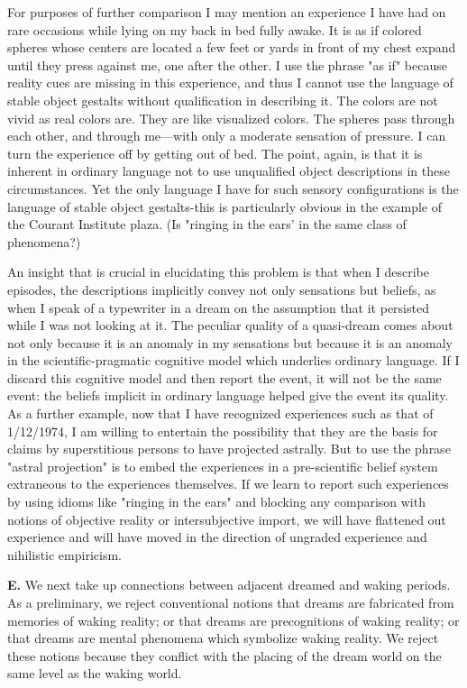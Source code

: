 \documentclass[10pt,twoside,draft]{memoir}
\begin{document}
{{For purposes of further comparison I may mention an experience I 
have had on rare occasions while lying on my back in bed fully awake. It is 
as if colored spheres whose centers are located a few feet or yards in front of 
my chest expand until they press against me, one after the other. I use the 
phrase "as if" because reality cues are missing in this experience, and thus I 
cannot use the language of stable object gestalts without qualification in 
describing it. The colors are not vivid as real colors are. They are like 
visualized colors. The spheres pass through each other, and through me---with 
only a moderate sensation of pressure. I can turn the experience off by 
getting out of bed. The point, again, is that it is inherent in ordinary 
language not to use unqualified object descriptions in these circumstances. 
Yet the only language I have for such sensory configurations is the language 
of stable object gestalts-this is particularly obvious in the example of the 
Courant Institute plaza. (Is "ringing in the ears' in the same class of 
phenomena?)

An insight that is crucial in elucidating this problem is that when I 
describe episodes, the descriptions implicitly convey not only sensations but 
beliefs, as when I speak of a typewriter in a dream on the assumption that it 
persisted while I was not looking at it. The peculiar quality of a quasi-dream 
comes about not only because it is an anomaly in my sensations but because 
it is an anomaly in the scientific-pragmatic cognitive model which underlies 
ordinary language. If I discard this cognitive model and then report the 
event, it will not be the same event: the beliefs implicit in ordinary language 
helped give the event its quality. As a further example, now that I have 
recognized experiences such as that of 1/12/1974, I am willing to entertain 
the possibility that they are the basis for claims by superstitious persons to 
have projected astrally. But to use the phrase "astral projection" is to embed 
the experiences in a pre-scientific belief system extraneous to the 
experiences themselves. If we learn to report such experiences by using 
idioms like "ringing in the ears" and blocking any comparison with notions 
of objective reality or intersubjective import, we will have flattened out 
experience and will have moved in the direction of ungraded experience and 
nihilistic empiricism. 

\textbf{E.} We next take up connections between adjacent dreamed and waking 
periods. As a preliminary, we reject conventional notions that dreams are 
fabricated from memories of waking reality; or that dreams are precognitions 
of waking reality; or that dreams are mental phenomena which symbolize 
waking reality. We reject these notions because they conflict with the placing 
of the dream world on the same level as the waking world. 

}}
\end{document}
